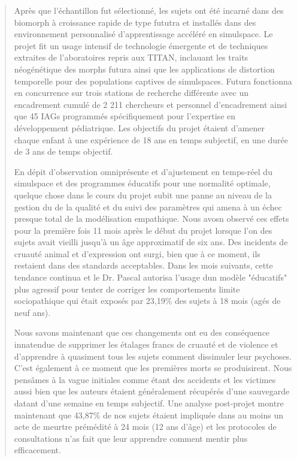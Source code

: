 \begin{quotation}
Après que l'échantillon fut sélectionné, les sujets ont été incarné dans des biomorph à croissance rapide de type fututra et installés dans des environnement personnalisé d'apprentissage accéléré en simulspace. Le projet fit un usage intensif de technologie émergente et de techniques extraites de l'aboratoires repris aux TITAN, inclauant les traits néogénétique des morphs futura ainsi que les applications de distortion temporelle pour des populations captives de simulspaces. Futura fonctionna en concurrence sur trois stations de recherche différente avec un encadrement cumulé de 2 211 chercheurs et personnel d'encadrement ainsi que 45 IAGs programmés spécifiquement pour l'expertise en développement pédiatrique. Les objectifs du projet étaient d'amener chaque enfant à une expérience de 18 ans en temps subjectif, en une durée de 3 ans de temps objectif. 

En dépit d'observation omniprésente et d'ajustement en temps-réel du simulspace et des programmes éducatifs pour une normalité optimale, quelque chose dans le cours du projet subit une panne au niveau de la gestion du de la qualité et du suivi des paramètres qui amena à un échec presque total de la modélisation empathique. Nous avosn observé ces effets pour la première fois 11 mois après le début du projet lorsque l'on des sujets avait vieilli jusqu'à un âge approximatif de six ans. Des incidents de cruauté animal et d'expression ont surgi, bien que à ce moment, ils restaient dans des standards acceptables. Dans les mois suivants, cette tendance continua et le Dr. Pascal autorisa l'usage dun modèle "éducatifs" plus agressif pour tenter de corriger les comportements limite sociopathique qui était exposés par 23,19\% des sujets à 18 mois (agés de neuf ans). 

Nous savons maintenant que ces changements ont eu des conséquence innatendue de supprimer les étalages francs de cruauté et de violence et d'apprendre à quasiment tous les sujets comment dissimuler leur psychoses. C'est également à ce moment que les premières morts se produisirent. Nous pensâmes à la vague initiales comme étant des accidents et les victimes aussi bien que les auteurs étaient généralement récupérés d'une sauvegarde datant d'une semaine en temps subjectif. Une analyse post-projet montre maintenant que 43,87\% de nos sujets étaient impliquée dans au moins un acte de meurtre prémédité à 24 mois (12 ans d'âge) et les protocoles de consultations n'as fait que leur apprendre comment mentir plus efficacement. 


\end{quotation}
